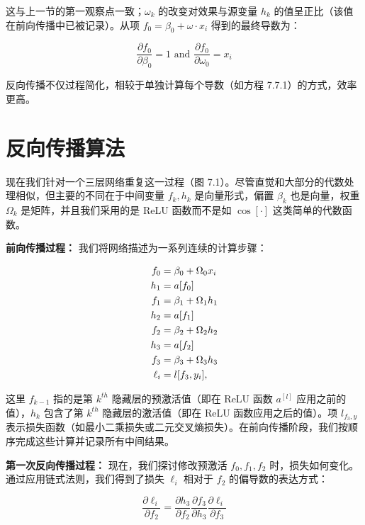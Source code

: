 \documentclass[lang=cn,newtx,10pt,scheme=chinese]{elegantbook}
\begin{document}
这与上一节的第一观察点一致；\(\omega_k\) 的改变对效果与源变量 \(h_k\) 的值呈正比（该值在前向传播中已被记录）。从项 \(f_0 = \beta_0 + \omega \cdot x_i\) 得到的最终导数为：

\begin{equation}
\frac{\partial f_0}{\partial \beta_0} = 1 \text{ and } \frac{\partial f_0}{\partial \omega_0} = x_i 
\end{equation}

反向传播不仅过程简化，相较于单独计算每个导数（如方程 7.7.1）的方式，效率更高。

\section{反向传播算法}
现在我们针对一个三层网络重复这一过程（图 7.1）。尽管直觉和大部分的代数处理相似，但主要的不同在于中间变量 \(f_k, h_k\) 是向量形式，偏置 \(\beta_k\) 也是向量，权重 \(\Omega_k\) 是矩阵，并且我们采用的是 ReLU 函数而不是如 \(\cos[\cdot]\) 这类简单的代数函数。

\textbf{前向传播过程：} 我们将网络描述为一系列连续的计算步骤：


\begin{align}
f_0 &= \beta_0 + \Omega_0x_i \notag \\
h_1 &= a[f_0] \notag \\
f_1 &= \beta_1 + \Omega_1h_1 \notag \\
h_2 &= a[f_1] \notag \\
f_2 &= \beta_2 + \Omega_2h_2 \notag \\
h_3 &= a[f_2] \notag \\
f_3 &= \beta_3 + \Omega_3h_3 \notag \\
\ell_i &= l[f_3, y_i], 
\end{align} 


这里 \(f_{k-1}\) 指的是第 \(k^{th}\) 隐藏层的预激活值（即在 ReLU 函数 \(a^{[l]}\) 应用之前的值），\(h_k\) 包含了第 \(k^{th}\) 隐藏层的激活值（即在 ReLU 函数应用之后的值）。项 \(l_{f_3, y}\) 表示损失函数（如最小二乘损失或二元交叉熵损失）。在前向传播阶段，我们按顺序完成这些计算并记录所有中间结果。

\textbf{第一次反向传播过程：} 现在，我们探讨修改预激活 \(f_0, f_1, f_2\) 时，损失如何变化。通过应用链式法则，我们得到了损失 \(\ell_i\) 相对于 \(f_2\) 的偏导数的表达方式：

\begin{equation}
\frac{\partial \ell_i}{\partial f_2} = \frac{\partial h_3}{\partial f_2} \frac{\partial f_3}{\partial h_3} \frac{\partial \ell_i}{\partial f_3} 
\end{equation}
\end{document}
